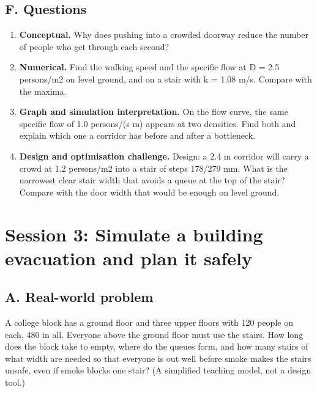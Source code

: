 \documentclass[11pt,a4paper]{article}
\begin{document}
\subsection*{F. Questions}
\begin{enumerate}[nosep]
\item \textbf{Conceptual.} Why does pushing into a crowded doorway reduce the number of people who get through each second?
\item \textbf{Numerical.} Find the walking speed and the specific flow at D = 2.5 persons/m2 on level ground, and on a stair with k = 1.08 m/s. Compare with the maxima.
\item \textbf{Graph and simulation interpretation.} On the flow curve, the same specific flow of 1.0 persons/(s m) appears at two densities. Find both and explain which one a corridor has before and after a bottleneck.
\item \textbf{Design and optimisation challenge.} Design: a 2.4 m corridor will carry a crowd at 1.2 persons/m2 into a stair of steps 178/279 mm. What is the narrowest clear stair width that avoids a queue at the top of the stair? Compare with the door width that would be enough on level ground.
\end{enumerate}

\section{Session 3: Simulate a building evacuation and plan it safely}

\subsection*{A. Real-world problem}
A college block has a ground floor and three upper floors with 120 people on each, 480 in all. Everyone above the ground floor must use the stairs. How long does the block take to empty, where do the queues form, and how many stairs of what width are needed so that everyone is out well before smoke makes the stairs unsafe, even if smoke blocks one stair? (A simplified teaching model, not a design tool.)
\end{document}
